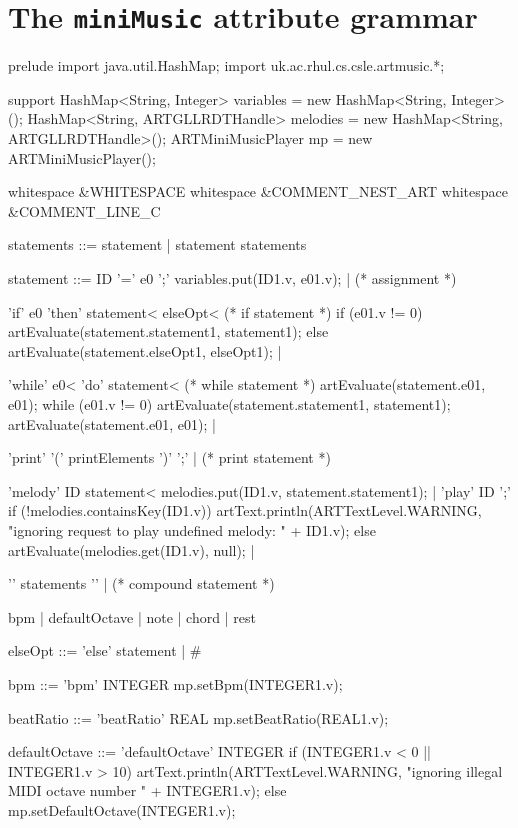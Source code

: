 \section{The {\tt miniMusic} attribute grammar}
\begin{codeblock}
prelude { import java.util.HashMap; import uk.ac.rhul.cs.csle.artmusic.*; }

support { 
HashMap<String, Integer> variables = new HashMap<String, Integer>(); 
HashMap<String, ARTGLLRDTHandle> melodies = new HashMap<String, ARTGLLRDTHandle>(); 
ARTMiniMusicPlayer mp = new ARTMiniMusicPlayer();
}

whitespace &WHITESPACE
whitespace &COMMENT_NEST_ART 
whitespace &COMMENT_LINE_C 

statements ::= statement | statement statements  

statement ::= ID '=' e0 ';' { variables.put(ID1.v, e01.v); } |     (* assignment *)

    'if' e0 'then' statement< elseOpt<         (* if statement *)
    { if (e01.v != 0) 
        artEvaluate(statement.statement1, statement1); 
      else
        artEvaluate(statement.elseOpt1, elseOpt1);  
    } |
    
    'while' e0< 'do' statement<      (* while statement *)
    { artEvaluate(statement.e01, e01); 
      while (e01.v != 0) { 
        artEvaluate(statement.statement1, statement1); 
        artEvaluate(statement.e01, e01); 
      } 
    } | 

    'print' '(' printElements ')' ';' |         (* print statement *)

    'melody' ID statement< { melodies.put(ID1.v, statement.statement1); } |
    'play' ID ';' 
      { if (!melodies.containsKey(ID1.v))
          artText.println(ARTTextLevel.WARNING, 
            "ignoring request to play undefined melody: " + ID1.v);
        else
          artEvaluate(melodies.get(ID1.v), null); 
      } |

    '{' statements '}' |              (* compound statement *)

    bpm | defaultOctave | note | chord |  rest

elseOpt ::= 'else' statement | #     

bpm ::= 'bpm' INTEGER { mp.setBpm(INTEGER1.v); }

beatRatio ::= 'beatRatio' REAL { mp.setBeatRatio(REAL1.v); }

defaultOctave ::= 'defaultOctave' INTEGER 
 { if (INTEGER1.v < 0 || INTEGER1.v > 10) 
     artText.println(ARTTextLevel.WARNING, 
       "ignoring illegal MIDI octave number " + INTEGER1.v);
    else
      mp.setDefaultOctave(INTEGER1.v); 
 }


\end{codeblock}
